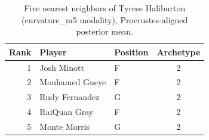 \begin{table}[htbp]
  \centering\small
  \begin{tabular}{rllc}
    \toprule
    Rank & Player & Position & Archetype \\
    \midrule
    1 & Josh Minott & F & 2 \\
    2 & Mouhamed Gueye & F & 2 \\
    3 & Rudy Fernandez & G & 2 \\
    4 & RaiQuan Gray & F & 2 \\
    5 & Monte Morris & G & 2 \\
    \bottomrule
  \end{tabular}
  \caption{Five nearest neighbors of Tyrese Haliburton (curvature_m5 modality), Procrustes-aligned posterior mean.}
  \label{tab:Tyrese_Haliburton_neighbors_curvature_m5}
\end{table}

